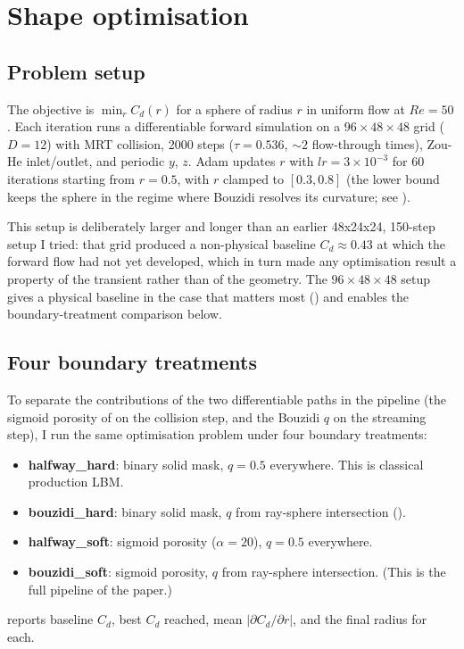 \documentclass[10pt,twocolumn]{article}
\begin{document}
\section{Shape optimisation}
\label{sec:optim}

\subsection{Problem setup}

The objective is $\min_r C_d(r)$ for a sphere of radius $r$ in
uniform flow at $Re = 50$. Each iteration runs a differentiable
forward simulation on a $96 \times 48 \times 48$ grid ($D = 12$) with
MRT collision, 2000 steps ($\tau = 0.536$, ${\sim}2$ flow-through
times), Zou-He inlet/outlet, and periodic $y$, $z$. Adam updates
$r$ with $lr = 3 \times 10^{-3}$ for 60 iterations starting from
$r = 0.5$, with $r$ clamped to $[0.3, 0.8]$ (the lower bound keeps
the sphere in the regime where Bouzidi resolves its curvature; see
).

This setup is deliberately larger and longer than an earlier
48x24x24, 150-step setup I tried: that grid produced a non-physical
baseline $C_d \approx 0.43$ at which the forward flow had not yet
developed, which in turn made any optimisation result a property of
the transient rather than of the geometry. The $96 \times 48 \times 48$
setup gives a physical baseline in the case that matters most
() and enables the boundary-treatment comparison
below.

\subsection{Four boundary treatments}
\label{sec:optim_modes}

To separate the contributions of the two differentiable paths in the
pipeline (the sigmoid porosity of  on the collision
step, and the Bouzidi $q$ on the streaming step), I run the same
optimisation problem under four boundary treatments:
%
\begin{itemize}\setlength\itemsep{0pt}
    \item \textbf{halfway\_hard}: binary solid mask, $q = 0.5$
    everywhere. This is classical production LBM.
    \item \textbf{bouzidi\_hard}: binary solid mask, $q$ from
    ray-sphere intersection ().
    \item \textbf{halfway\_soft}: sigmoid porosity ($\alpha = 20$),
    $q = 0.5$ everywhere.
    \item \textbf{bouzidi\_soft}: sigmoid porosity, $q$ from
    ray-sphere intersection. (This is the full pipeline of the paper.)
\end{itemize}
%
 reports baseline $C_d$, best $C_d$ reached,
mean $|\partial C_d / \partial r|$, and the final radius for each.
\end{document}
